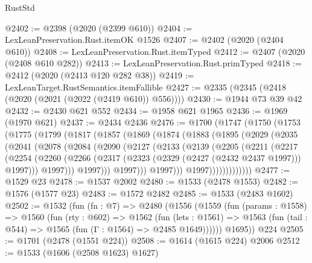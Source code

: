 \begin{lexlean}{RustStd}
\begin{coremodule}
@2402 := @2398 (@2020 (@2399 @610))
@2404 := LexLeanPreservation.Rust.itemOK @1526
@2407 := @2402 (@2020 (@2404 @610))
@2408 := LexLeanPreservation.Rust.itemTyped
@2412 := @2407 (@2020 (@2408 @610 @282))
@2413 := LexLeanPreservation.Rust.primTyped
@2418 := @2412 (@2020 (@2413 @120 @282 @38))
@2419 := LexLeanTarget.RustSemantics.itemFallible
@2427 := @2335 (@2345 (@2418 (@2020 (@2021 (@2022 (@2419 @610)) @556))))
@2430 := @1944 @73 @39 @42
@2432 := @2430 @621 @552
@2434 := @1958 @621 @1965
@2436 := @1969 (@1970 @621)
@2437 := @2434 @2436
@2476 := @1700
    (@1747
      (@1750
        (@1753
          (@1775
            (@1799
              (@1817
                (@1857
                  (@1869
                    (@1874
                      (@1883
                        (@1895
                          (@2029
                            (@2035
                              (@2041
                                (@2078
                                  (@2084
                                    (@2090
                                      (@2127
                                        (@2133
                                          (@2139
                                            (@2205
                                              (@2211
                                                (@2217
                                                  (@2254
                                                    (@2260
                                                      (@2266
                                                        (@2317
                                                          (@2323
                                                            (@2329 (@2427 (@2432 @2437 @1997)))
                                                            @1997)))
                                                      @1997)))
                                                @1997)))
                                          @1997)))
                                    @1997)))
                              @1997)))))))))))))
@2477 := @1529 @23
@2478 := @1537 @2002
@2480 := @1533 (@2478 @1553)
@2482 := @1576 (@1577 @23)
@2483 := @1572 @2482
@2485 := @1533 (@2483 @1602)
@2502 := @1532
    (fun (fn : @7) =>
    @2480
      (@1556
        (@1559
          (fun (params : @1558) =>
          @1560
            (fun (rty : @602) =>
            @1562
              (fun (lets : @1561) =>
              @1563 (fun (tail : @544) => @1565 (fun (Γ : @1564) => @2485 @1649))))))
        @1695))
    @224
@2505 := @1701 (@2478 (@1551 @224))
@2508 := @1614 (@1615 @224) @2006
@2512 := @1533 (@1606 (@2508 @1623) @1627)

\end{coremodule}
\end{lexlean}

